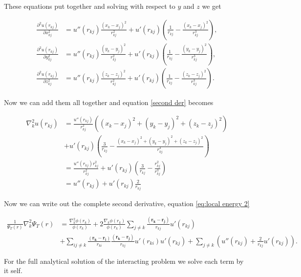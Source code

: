 \documentclass[a4paper,10pt,twoside]{report}
\begin{document}
These equations put together and solving with respect to $y$ and $z$ we get 

\begin{align*}
\frac{\partial^2 u(r_{kj})}{\partial x_{kj}^2} &= u''(r_{kj}) \frac{(x_k - x_j)^2}{r_{kj}^2} + u'(r_{kj}) \left(\frac{1}{r_{kj}} - \frac{(x_k - x_j)^2}{r_{kj}^3}\right),\\
\frac{\partial^2 u(r_{kj})}{\partial y_{kj}^2} &= u''(r_{kj}) \frac{(y_k - y_j)^2}{r_{kj}^2} + u'(r_{kj}) \left(\frac{1}{r_{kj}} - \frac{(y_k - y_j)^2}{r_{kj}^3}\right),\\
\frac{\partial^2 u(r_{kj})}{\partial z_{kj}^2} &= u''(r_{kj}) \frac{(z_k - z_j)^2}{r_{kj}^2} + u'(r_{kj}) \left(\frac{1}{r_{kj}} - \frac{(z_k - z_j)^2}{r_{kj}^3}\right).
\end{align*}

Now we can add them all together and equation \eqref{second der} becomes

\begin{align*}
\nabla_k^2 u(r_{kj}) &= \frac{u''(r_{kj})}{r_{kj}^2} ((x_k - x_j)^2 + (y_k - y_j)^2 + (z_k - z_j)^2) \\
&+ u'(r_{kj}) \left(\frac{3}{r_{kj}} - \frac{(x_k - x_j)^2 + (y_k - y_j)^2 + (z_k - z_j)^2}{r_{kj}^3}\right)\\
&= \frac{u''(r_{kj}) r_{kj}^2}{r_{kj}^2} + u'(r_{kj}) \left( \frac{3}{r_{kj}} - \frac{r_{kj}^2}{r_{kj}^3}\right)\\
&= u''(r_{kj}) + u'(r_{kj})\frac{2}{r_{kj}}
\end{align*}

Now we can write out the complete second derivative, equation \eqref{eq:local energy 2} 

\begin{align*}
\frac{1}{\Psi_T(r)}\nabla_k^2 \Psi_T(r) &= \frac{\nabla_k^2 \phi(r_k)}{\phi(r_k)} + 2\frac{\nabla_k \phi(r_k)}{\phi(r_k)} \sum_{j \ne k} \frac{(\boldsymbol{r_k} - \boldsymbol{r_j})}{r_{kj}} u'(r_{kj}) \\
&+ \sum_{ij \ne k} \frac{(\boldsymbol{r_k} - \boldsymbol{r_i})}{r_{ki}} \frac{(\boldsymbol{r_k} - \boldsymbol{r_j})}{r_{kj}} u'(r_{ki}) u'(r_{kj}) + \sum_{j \ne k} \left(u''(r_{kj}) + \frac{2}{r_{kj}}u'(r_{kj})\right).
\end{align*}


For the full analytical solution of the interacting problem we solve each term by it self.
\end{document}
